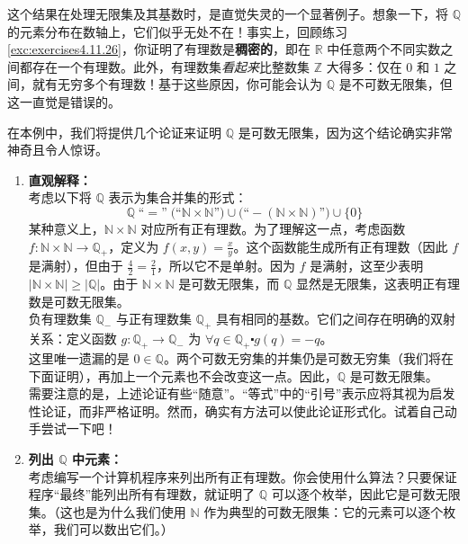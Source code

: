 \begin{example}

    这个结果在处理无限集及其基数时，是直觉失灵的一个显著例子。想象一下，将 $\mathbb{Q}$ 的元素分布在数轴上，它们似乎无处不在！事实上，回顾练习 \ref{exc:exercises4.11.26}，你证明了有理数是\textbf{稠密的}，即在 $\mathbb{R}$ 中任意两个不同实数之间都存在一个有理数。此外，有理数集\emph{看起来}比整数集 $\mathbb{Z}$ 大得多：仅在 $0$ 和 $1$ 之间，就有无穷多个有理数！基于这些原因，你可能会认为 $\mathbb{Q}$ 是不可数无限集，但这一直觉是错误的。

    在本例中，我们将提供几个论证来证明 $\mathbb{Q}$ 是可数无限集，因为这个结论确实非常神奇且令人惊讶。

    \begin{enumerate}[label=(\arabic*)]
        \item \textbf{直观解释：}\\
              考虑以下将 $\mathbb{Q}$ 表示为集合并集的形式：
              \[\mathbb{Q} \;\text{``}=\text{''}\; \big(\text{``}\mathbb{N} \times \mathbb{N}\text{''}\big) \cup \big(\text{``}-(\mathbb{N} \times \mathbb{N})\text{''}\big) \cup \{0\}\]
              某种意义上，$\mathbb{N} \times \mathbb{N}$ 对应所有正有理数。为了理解这一点，考虑函数 $f : \mathbb{N} \times \mathbb{N} \to \mathbb{Q}_+$，定义为 $f(x, y) = \frac{x}{y}$。这个函数能生成所有正有理数（因此 $f$ 是满射），但由于 $\frac{4}{2}=\frac{2}{1}$，所以它不是单射。因为 $f$ 是满射，这至少表明 $|\mathbb{N} \times \mathbb{N}| \ge |\mathbb{Q}|$。由于 $\mathbb{N} \times \mathbb{N}$ 是可数无限集，而 $\mathbb{Q}$ 显然是无限集，这表明正有理数是可数无限集。\\

              负有理数集 $\mathbb{Q}_-$ 与正有理数集 $\mathbb{Q}_+$ 具有相同的基数。它们之间存在明确的双射关系：定义函数 $g : \mathbb{Q}_+ \to \mathbb{Q}_-$ 为 $\forall q \in \mathbb{Q}_+ \centerdot g(q) = -q$。\\

              这里唯一遗漏的是 $0 \in \mathbb{Q}$。两个可数无穷集的并集仍是可数无穷集（我们将在下面证明），再加上一个元素也不会改变这一点。因此，$\mathbb{Q}$ 是可数无限集。\\

              需要注意的是，上述论证有些``随意''。``等式''中的``引号''表示应将其视为启发性论证，而非严格证明。然而，确实有方法可以使此论证形式化。试着自己动手尝试一下吧！\\
        \item \textbf{列出 $\mathbb{Q}$ 中元素：}\\
              考虑编写一个计算机程序来列出所有正有理数。你会使用什么算法？只要保证程序``最终''能列出所有有理数，就证明了 $\mathbb{Q}$ 可以逐个枚举，因此它是可数无限集。（这也是为什么我们使用 $\mathbb{N}$ 作为典型的可数无限集：它的元素可以逐个枚举，我们可以数出它们。）\\


\end{enumerate}
\end{example}
